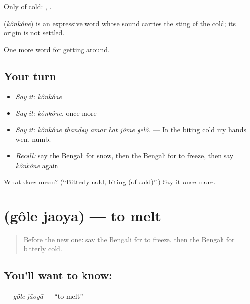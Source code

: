 Only of cold:  ,  .

\begin{cousinweb}
\textbf{} (\emph{kônkône}) is an expressive word whose sound carries the sting of the cold; its origin is not settled.
\end{cousinweb}

\begin{grammarlens}[title={What you've built}]
One more word for getting around.
\end{grammarlens}

\subsection*{Your turn}
\begin{itemize}
\raggedright
  \item \emph{Say it:} \emph{kônkône}
  \item \emph{Say it:} \emph{kônkône}, once more
  \item \emph{Say it:} \emph{kônkône ṭhānḍāy āmār hāt jôme gelô.} — In the biting cold my hands went numb.
  \item \emph{Recall:} say the Bengali for snow, then the Bengali for to freeze, then say \emph{kônkône} again
\end{itemize}

\begin{tcolorbox}[breakable,colback=teal!4,colframe=teal!35!black,title={Before you move on}]
What does  mean? (\textquotedblleft{}Bitterly cold; biting (of cold)\textquotedblright{}.) Say it once more.
\end{tcolorbox}
\section[\texorpdfstring{\bn{গলে} \bn{যাওয়া} (gôle jāoyā)}{গলে যাওয়া (gôle jāoyā)}]{  (gôle jāoyā) — to melt}

\label{lesson:BN-C426-gole-jaoya}



\begin{quote}
Before the new one: say the Bengali for to freeze, then the Bengali for bitterly cold.
\end{quote}

\subsection*{You'll want to know:  }
\textbf{ } — \emph{gôle jāoyā} — \textquotedblleft{}to melt\textquotedblright{}.


